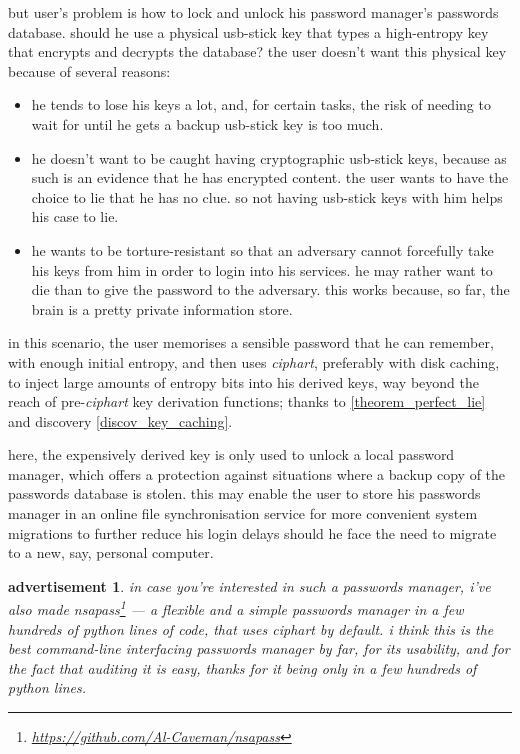 \documentclass[twocolumn]{article}
\newtheorem{advertisement}{advertisement}
\begin{document}
but user's problem is how to lock and unlock his password manager's
passwords database.  should he use a physical usb-stick key that types a
high-entropy key that encrypts and decrypts the database?   the user
doesn't want this physical key because of several reasons:
\begin{itemize}
    \item he tends to lose his keys a lot, and, for certain tasks, the risk
    of needing to wait for until he gets a backup usb-stick key is too
    much.

    \item he doesn't want to be caught having cryptographic usb-stick keys,
    because as such is an evidence that he has encrypted content.  the user
    wants to have the choice to lie that he has no clue.  so not having
    usb-stick keys with him helps his case to lie.

    \item he wants to be torture-resistant so that an adversary cannot
    forcefully take his keys from him in order to login into his services.
    he may rather want to die than to give the password to the adversary.
    this works because, so far, the brain is a pretty private information
    store.
\end{itemize}

in this scenario, the user memorises a sensible password that he can
remember, with enough initial entropy, and then uses \emph{ciphart},
preferably with disk caching, to inject large amounts of entropy bits into
his derived keys, way beyond the reach of pre-\emph{ciphart} key derivation
functions; thanks to \cref{theorem_perfect_lie} and discovery
\ref{discov_key_caching}.  

here, the expensively derived key is only used to unlock a local password
manager, which offers a protection against situations where a backup copy
of the passwords database is stolen.  this may enable the user to store his
passwords manager in an online file synchronisation service for more
convenient system migrations to further reduce his login delays should he
face the need to migrate to a new, say, personal computer.

\begin{advertisement}
    in case you're interested in such a passwords manager, i've also made
    \emph{nsapass}\footnote{\url{https://github.com/Al-Caveman/nsapass}}
    --- a flexible and a simple passwords manager in a few hundreds of
    python lines of code, that uses \emph{ciphart} by default.  i think
    this is the best command-line interfacing passwords manager by far, for
    its usability, and for the fact that auditing it is easy, thanks for it
    being only in a few hundreds of python lines.
\end{advertisement}
\end{document}
